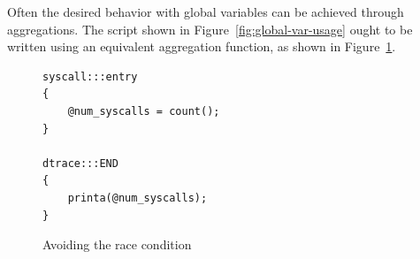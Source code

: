 \noindent
Often the desired behavior with global variables can be achieved through
aggregations. The script shown in Figure~\ref{fig:global-var-usage} ought to be
written using an equivalent aggregation function, as shown in
Figure~\ref{fig:avoiding-the-race}.

\begin{figure}
  \begin{lstlisting}
syscall:::entry
{
    @num_syscalls = count();
}

dtrace:::END
{
    printa(@num_syscalls);
}
  \end{lstlisting}
  \caption{Avoiding the race condition}
  \label{fig:avoiding-the-race}
\end{figure}
